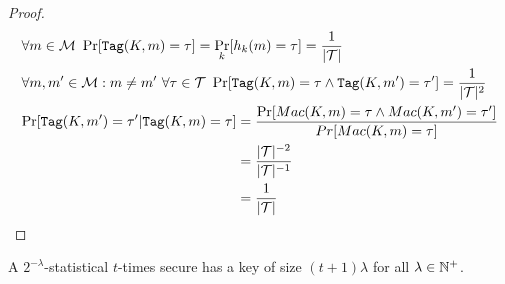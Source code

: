 \begin{proof}
	\begin{equation*}
		\begin{aligned}
			&\forall m \in \mathcal{M} \ \Pr[\texttt{Tag}(K, m) = \tau] = \Pr_k[h_k(m) = \tau] = \frac{1}{|\mathcal{T}|} \\
			&\forall m, m' \in \mathcal{M} : m \neq m' \ \forall \tau \in \mathcal{T} \ \Pr[\texttt{Tag}(K, m) = \tau \wedge \texttt{Tag}(K, m') = \tau'] = \frac{1}{|\mathcal{T}|^2} \\
			&\begin{aligned}
				\Pr[\texttt{Tag}(K, m') = \tau' | \texttt{Tag}(K, m) = \tau] &= \frac{\Pr[Mac(K,m)=\tau \wedge Mac(K,m')=\tau']}{Pr[Mac(K,m)=\tau]} \\
				&= \frac{|\mathcal{T}|^{-2}}{|\mathcal{T}|^{-1}} \\
				&= \frac{1}{|\mathcal{T}|}
			\end{aligned}
		\end{aligned}
	\end{equation*}
\end{proof}

\begin{lemma}
    A $2^{-\lambda}$-statistical $t$-times secure \Mac{} has a key of size $(t+1) \lambda$ for all $\lambda \in \mathbb{N}^{+}$.
\end{lemma}